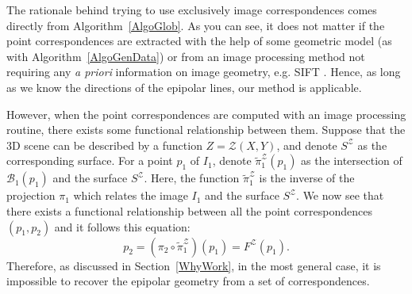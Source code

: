 \documentclass{ipol}
\newcommand{\Bund}[1]{\ensuremath{\mathcal{B}_{#1}}}
\newcommand{\BundO}{\Bund{1}}
\newcommand{\PiZVert}{\widetilde{\pi}_1^{\mathcal{Z}} }
\begin{document}
The rationale behind trying to use exclusively image correspondences comes directly from Algorithm~\ref{AlgoGlob}. As you can see, it does not matter if the point correspondences are extracted with the help of some geometric model (as with Algorithm~\ref{AlgoGenData}) or from an image processing method not requiring any
\emph{a priori} information on image geometry, e.g. SIFT \cite{lowe2004distinctive}. Hence, as long as we know the directions of the epipolar lines, our method is applicable.

However, when the point correspondences are computed with an image processing routine,
 there exists some functional relationship between them. Suppose that the 3D scene can be described by a function $Z=\mathcal{Z}(X,Y)$, and denote $S^\mathcal{Z}$ as the corresponding surface. For a point $p_1$ of $I_1$, denote $ \PiZVert (p_1)$ as the intersection of  $\BundO(p_1)$ and the surface  $S^\mathcal{Z}$. Here, the function $\PiZVert$ is the inverse of the projection  $\pi_1$ which relates the image $I_1$ and the surface $S^\mathcal{Z}$. We now see that there exists a functional relationship between all the point correspondences $(p_1,p_2)$ and it follows this equation:
\begin{equation}
   p_2 = (\pi_2 \circ  \PiZVert) (p_1) = F^\mathcal{Z}(p_1).
\end{equation}
Therefore, as discussed in Section~\ref{WhyWork}, in the most general
case, it is impossible to recover the epipolar geometry from a set of correspondences.
%



%
\end{document}
